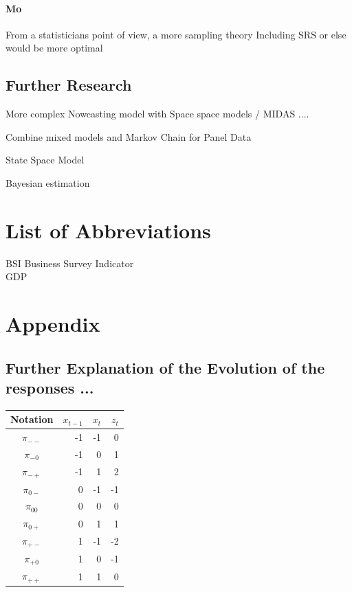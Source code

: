 \documentclass[12pt,a4paper,oneside]{book}
\begin{document}
\subsubsection*{Mo}
From a statisticians point of view, a more sampling theory Including SRS or else would be more optimal

\section{Further Research}



More complex Nowcasting model with Space space models / MIDAS ....

Combine mixed models and Markov Chain for Panel Data \citep{de_haan-rietdijk_use_2017} 

State Space Model

Bayesian estimation \cite{bialowolski_bayesian_nodate}

\nocite{hlavac_stargazer:_2018}


 

\chapter*{List of Abbreviations}
  BSI Business Survey Indicator \\
  GDP   \\
  
\begin{appendix}
  \listoffigures
  \listoftables
\end{appendix}


\chapter*{Appendix}

\section*{Further Explanation of the Evolution of the responses ...}
\begin{center}
\begin{tabular}{|c|r|r|r|}
Notation    &  $x_{t-1}$ & $x_t$ & $z_t$ \\\hline
$\pi_{--}$    &  -1  & -1    & 0 \\
$\pi_{-0}$    &  -1  & 0     & 1 \\
$\pi_{-+}$    &  -1  & 1     & 2 \\
$\pi_{0-}$    &  0   & -1    & -1 \\
$\pi_{00}$    &  0   & 0     & 0 \\
$\pi_{0+}$    &  0   & 1     & 1 \\
$\pi_{+-}$    &  1   & -1    & -2 \\
$\pi_{+0}$    &  1   & 0     & -1 \\
$\pi_{++}$    &  1   & 1     & 0 \\
\end{tabular}  
\end{center}
\end{document}

